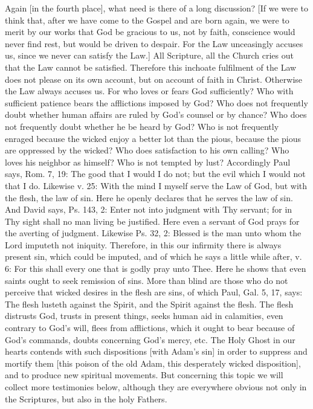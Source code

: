Again [in the fourth place], what need is there of a long discussion?
[If we were to think that, after we have come to the Gospel and are
born again, we were to merit by our works that God be gracious to us,
not by faith, conscience would never find rest, but would be driven
to despair.  For the Law unceasingly accuses us, since we never can
satisfy the Law.] All Scripture, all the Church cries out that the
Law cannot be satisfied.  Therefore this inchoate fulfilment of the
Law does not please on its own account, but on account of faith in
Christ.  Otherwise the Law always accuses us.  For who loves or fears
God sufficiently?  Who with sufficient patience bears the afflictions
imposed by God?  Who does not frequently doubt whether human affairs
are ruled by God's counsel or by chance?  Who does not frequently
doubt whether he be heard by God?  Who is not frequently enraged
because the wicked enjoy a better lot than the pious, because the
pious are oppressed by the wicked?  Who does satisfaction to his own
calling?  Who loves his neighbor as himself?  Who is not tempted by
lust?  Accordingly Paul says, Rom. 7, 19: The good that I would I do
not; but the evil which I would not that I do.  Likewise v. 25: With
the mind I myself serve the Law of God, but with the flesh, the law
of sin.  Here he openly declares that he serves the law of sin.  And
David says, Ps. 143, 2: Enter not into judgment with Thy servant; for
in Thy sight shall no man living be justified.  Here even a servant
of God prays for the averting of judgment.  Likewise Ps. 32, 2:
Blessed is the man unto whom the Lord imputeth not iniquity.
Therefore, in this our infirmity there is always present sin, which
could be imputed, and of which he says a little while after, v. 6:
For this shall every one that is godly pray unto Thee.  Here he shows
that even saints ought to seek remission of sins.  More than blind
are those who do not perceive that wicked desires in the flesh are
sins, of which Paul, Gal. 5, 17, says: The flesh lusteth against the
Spirit, and the Spirit against the flesh.  The flesh distrusts God,
trusts in present things, seeks human aid in calamities, even
contrary to God's will, flees from afflictions, which it ought to
bear because of God's commands, doubts concerning God's mercy, etc.
The Holy Ghost in our hearts contends with such dispositions [with
Adam's sin] in order to suppress and mortify them [this poison of the
old Adam, this desperately wicked disposition], and to produce new
spiritual movements.  But concerning this topic we will collect more
testimonies below, although they are everywhere obvious not only in
the Scriptures, but also in the holy Fathers.


